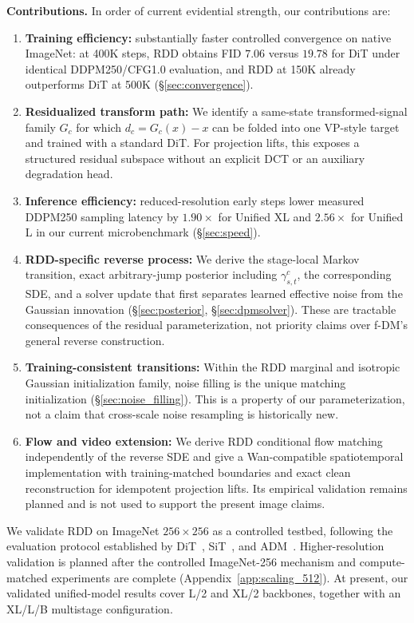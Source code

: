 \documentclass[10pt]{article}
\begin{document}
\textbf{Contributions.} In order of current evidential strength, our contributions are:
\begin{enumerate}
    \item \textbf{Training efficiency:} substantially faster controlled convergence on native ImageNet: at 400K steps, RDD obtains FID $7.06$ versus $19.78$ for DiT under identical DDPM250/CFG1.0 evaluation, and RDD at 150K already outperforms DiT at 500K (\S\ref{sec:convergence}).
    \item \textbf{Residualized transform path:} We identify a same-state transformed-signal family $G_c$ for which $d_c=G_c(x)-x$ can be folded into one VP-style target and trained with a standard DiT. For projection lifts, this exposes a structured residual subspace without an explicit DCT or an auxiliary degradation head.
    \item \textbf{Inference efficiency:} reduced-resolution early steps lower measured DDPM250 sampling latency by $1.90\times$ for Unified XL and $2.56\times$ for Unified L in our current microbenchmark (\S\ref{sec:speed}).
    \item \textbf{RDD-specific reverse process:} We derive the stage-local Markov transition, exact arbitrary-jump posterior including $\gamma_{s,t}^c$, the corresponding SDE, and a solver update that first separates learned effective noise from the Gaussian innovation (\S\ref{sec:posterior}, \S\ref{sec:dpmsolver}). These are tractable consequences of the residual parameterization, not priority claims over f-DM's general reverse construction.
    \item \textbf{Training-consistent transitions:} Within the RDD marginal and isotropic Gaussian initialization family, noise filling is the unique matching initialization (\S\ref{sec:noise_filling}). This is a property of our parameterization, not a claim that cross-scale noise resampling is historically new.
    \item \textbf{Flow and video extension:} We derive RDD conditional flow matching independently of the reverse SDE and give a Wan-compatible spatiotemporal implementation with training-matched boundaries and exact clean reconstruction for idempotent projection lifts. Its empirical validation remains planned and is not used to support the present image claims.
\end{enumerate}


We validate RDD on ImageNet $256\times256$ as a controlled testbed, following the evaluation protocol established by DiT~\citep{peebles2023dit}, SiT~\citep{ma2024sit}, and ADM~\citep{dhariwal2021adm}.
Higher-resolution validation is planned after the controlled ImageNet-256 mechanism and compute-matched experiments are complete (Appendix~\ref{app:scaling_512}).
At present, our validated unified-model results cover L/2 and XL/2 backbones, together with an XL/L/B multistage configuration.
\end{document}
